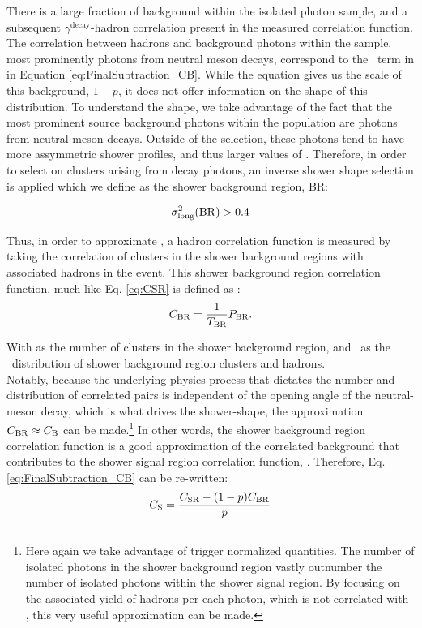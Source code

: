 There is a large fraction of \ydecay background within the isolated photon sample, and a subsequent $\gamma^\mathrm{decay}$-hadron correlation present in the measured correlation function. The correlation between hadrons and background photons within the \gammaiso sample, most prominently photons from neutral meson decays, correspond to the \CB~term in in Equation \ref{eq:FinalSubtraction_CB}. While the equation gives us the scale of this background, $1-p$, it does not offer information on the shape of this \deltaphi distribution. To understand the shape, we take advantage of the fact that the most prominent source background photons within the \gammaiso population are photons from neutral meson decays. Outside of the \gammaiso selection, these photons tend to have more assymmetric shower profiles, and thus larger values of \lambdasquare. Therefore, in order to select on clusters arising from decay photons, an inverse shower shape selection is applied which we define as the shower background region, BR:

\begin{equation}
	\label{eq:BR}
	\sigma^{2}_{\mathrm{long}}(\mathrm{BR}) > 0.4
\end{equation}

Thus, in order to approximate \CB, a \ydecay hadron correlation function is measured by taking the correlation of clusters in the shower background regions with associated hadrons in the event. This shower background region correlation function, much like Eq. \ref{eq:CSR} is defined as \CBR:
\begin{equation}
C_{\mathrm{BR}} = \frac{1}{T_{\mathrm{BR}}}P_{\mathrm{BR}}.
\end{equation}

With \TBR as the number of clusters in the shower background region, and \PBR~as the \deltaphi~distribution of shower background region clusters and hadrons.\\

Notably, because the underlying physics process that dictates the number and distribution of correlated pairs is independent of the opening angle of the neutral-meson decay, which is what drives the shower-shape, the approximation $C_{\mathrm{BR}} \approx C_{\mathrm{B}}$ can be made.\footnote{Here again we take advantage of trigger normalized quantities. The number of isolated photons in the shower background region vastly outnumber the number of isolated photons within the shower signal region. By focusing on the associated yield of hadrons per each photon, which is not correlated with \lambdasquare, this very useful approximation can be made.} In other words, the shower background region correlation function is a good approximation of the correlated background that contributes to the shower signal region correlation function, \CSR. Therefore, Eq. \ref{eq:FinalSubtraction_CB} can be re-written:
\begin{equation}
C_{\mathrm{S}} = \frac{C_{\mathrm{SR}} - (1-p) C_{\mathrm{BR}}}{p}
\label{eq:FinalSubtraction}
\end{equation}


